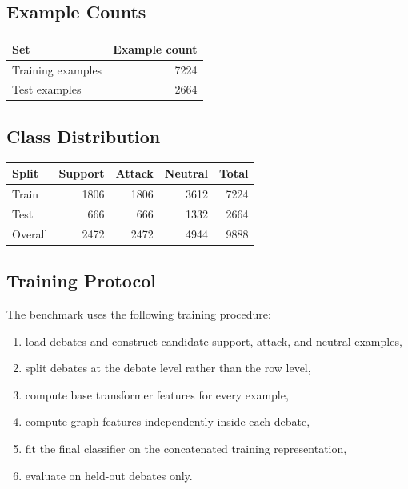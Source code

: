 \documentclass[11pt,a4paper]{article}
\begin{document}
\subsection{Example Counts}
\begin{center}
\begin{tabular}{lr}
\toprule
Set & Example count \\
\midrule
Training examples & 7224 \\
Test examples & 2664 \\
\bottomrule
\end{tabular}
\end{center}

\subsection{Class Distribution}
\begin{center}
\begin{tabular}{lrrrr}
\toprule
Split & Support & Attack & Neutral & Total \\
\midrule
Train & 1806 & 1806 & 3612 & 7224 \\
Test & 666 & 666 & 1332 & 2664 \\
Overall & 2472 & 2472 & 4944 & 9888 \\
\bottomrule
\end{tabular}
\end{center}

\subsection{Training Protocol}
The benchmark uses the following training procedure:
\begin{enumerate}[label=\arabic*.]
  \item load debates and construct candidate support, attack, and neutral examples,
  \item split debates at the debate level rather than the row level,
  \item compute base transformer features for every example,
  \item compute graph features independently inside each debate,
  \item fit the final classifier on the concatenated training representation,
  \item evaluate on held-out debates only.
\end{enumerate}
\end{document}
